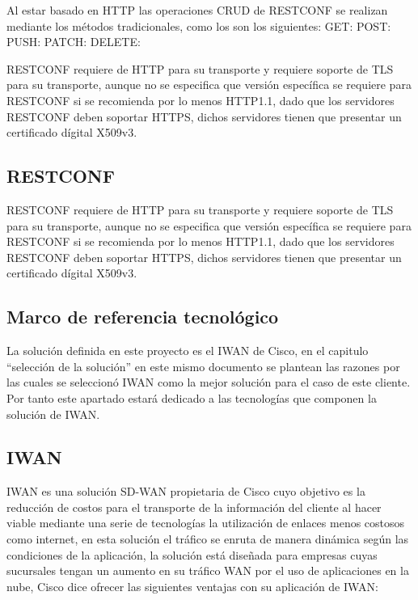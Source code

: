 Al estar basado en HTTP las operaciones CRUD de RESTCONF se realizan mediante los métodos tradicionales, como los son los siguientes:
GET:
POST:
PUSH:
PATCH:
DELETE:

RESTCONF requiere de HTTP para su transporte y requiere soporte de TLS para su transporte, aunque no se especifica que versión específica se requiere para RESTCONF si se recomienda por lo menos HTTP1.1, dado que los servidores RESTCONF deben soportar HTTPS, dichos servidores tienen que presentar un certificado dígital X509v3.

\subsection{RESTCONF}
\label{sec:RESTCONF}

RESTCONF requiere de HTTP para su transporte y requiere soporte de TLS para su transporte, aunque no se especifica que versión específica se requiere para RESTCONF si se recomienda por lo menos HTTP1.1, dado que los servidores RESTCONF deben soportar HTTPS, dichos servidores tienen que presentar un certificado dígital X509v3.

\subsection{Marco de referencia tecnológico}
\label{sec:Marco de referencia tecnológico}

La solución definida en este proyecto es el IWAN de Cisco, en el capitulo “selección de la solución” en este mismo documento se plantean las razones por las cuales se seleccionó IWAN como la mejor solución para el caso de este cliente. Por tanto este apartado estará dedicado a las tecnologías que componen la solución de IWAN.


\subsection{IWAN}
\label{sec:IWAN}

IWAN es una solución SD-WAN propietaria de Cisco cuyo objetivo es la reducción de costos para el transporte de la información del cliente al hacer viable mediante una serie de tecnologías la utilización de enlaces menos costosos como internet, en esta solución el tráfico se enruta de manera dinámica según las condiciones de la aplicación, la solución está diseñada para empresas cuyas sucursales tengan un aumento en su tráfico WAN por el uso de aplicaciones en la nube, Cisco dice ofrecer las siguientes ventajas con su aplicación de IWAN:




